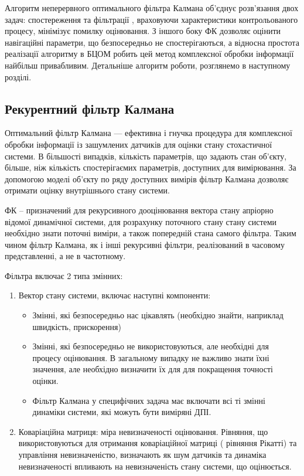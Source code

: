 Алгоритм неперервного оптимального фільтра Калмана об'єднує розв'язання двох задач: 
спостереження та фільтрації , враховуючи характеристики контрольованого процесу, 
мінімізує помилку оцінювання. З іншого боку ФК дозволяє оцінити навігаційні параметри, що
безпосередньо не спостерігаються, а відносна простота реалізації алгоритму в БЦОМ робить цей метод комплексної обробки інформації найбільш привабливим. Детальніше алгоритм роботи, розглянемо в наступному розділі.

\subsection{Рекурентний фільтр Калмана}

Оптимальний фільтр Калмана \cite{bib:kalman_1} — ефективна і гнучка процедура для комплексної обробки інформації із зашумлених 
датчиків для оцінки стану стохастичної системи. В більшості випадків, кількість параметрів, що задають стан об’єкту, більше, ніж
кількість спостерігаємих параметрів, доступних для вимірювання. За допомогою моделі об’єкту по ряду доступних вимірів фільтр Калмана
дозволяє отримати оцінку внутрішнього стану системи.

ФК -- призначений для рекурсивного дооцінювання вектора стану апріорно відомої динамічної системи, для розрахунку
поточного стану стану системи необхідно знати поточні виміри, а також попередній стана самого фільтра. Таким чином фільтр Калмана,
як і інші рекурсивні фільтри, реалізований в часовому представленні, а не в частотному.

Фільтра включає 2 типа змінних:
\begin{enumerate}
 \item Вектор стану системи, включає наступні компоненти:
  \begin{itemize}
    \item Змінні, які безпосередньо нас цікавлять (необхідно знайти, наприклад швидкість, прискорення)
    \item Змінні, які безпосередньо не використовуються, але необхідні для процесу оцінювання. 
    В загальному випадку не важливо знати їхні значення, але необхідно визначити їх для для 
    покращення точності оцінки.
    \item Фільтр Калмана у специфічних задача має включати всі ті змінні динаміки системи, які можуть 
    бути виміряні ДПІ.
    \end{itemize}
 \item Коваріаційна матриця: міра невизначеності оцінювання. Рівняння, що використовуються для 
отримання коваріаційної матриці ( рівняння Рікатті) та управління невизначеністю, визначають 
як шум датчиків та динаміка невизначеності впливають на невизначеність стану системи, що оцінюється.
\end{enumerate}

